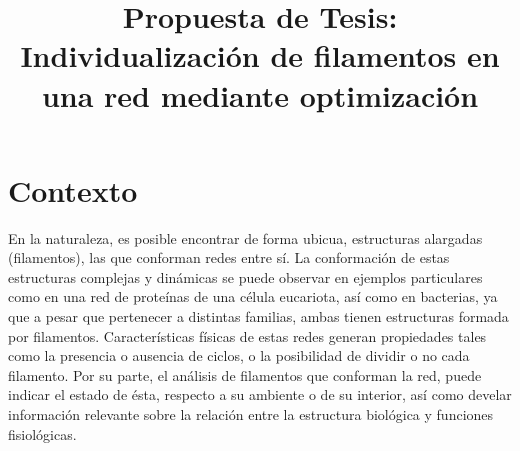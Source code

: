 \documentclass{article}
\title{Propuesta de Tesis: Individualizaci\'on de filamentos en una red mediante optimizaci\'on}
\date{}
\begin{document}
\maketitle

\section{Contexto}
\label{contexto}

En la naturaleza, es posible encontrar de forma ubicua, estructuras alargadas (filamentos), las que conforman redes entre sí. La conformación de estas estructuras complejas y din\'amicas se puede observar en ejemplos particulares como en una red de prote\'inas de una c\'elula eucariota, as\'i como en bacterias, ya que a pesar que pertenecer a distintas familias, ambas tienen estructuras formada por filamentos. 
Caracter\'isticas f\'isicas de estas redes generan propiedades tales como la presencia o ausencia de ciclos, o la posibilidad de dividir o no cada filamento. Por su parte, el análisis de filamentos que conforman la red, puede indicar el estado de \'esta, respecto a su ambiente o de su interior, as\'i como develar informaci\'on relevante sobre la relaci\'on entre la estructura biol\'ogica y funciones fisiol\'ogicas.  
  
\end{document}
